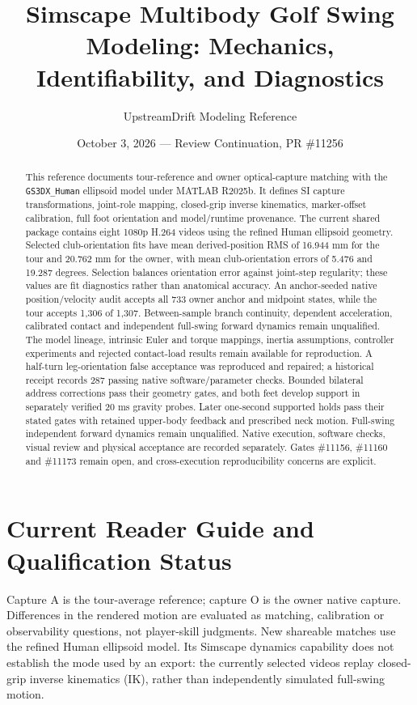\documentclass[11pt,a4paper]{article}
\title{\textbf{Simscape Multibody Golf Swing Modeling: Mechanics, Identifiability, and Diagnostics}}
\author{UpstreamDrift Modeling Reference}
\date{October 3, 2026 --- Review Continuation, PR \#11256}
\begin{document}
\maketitle

\begin{abstract}
This reference documents tour-reference and owner optical-capture matching with
the \texttt{GS3DX\_Human} ellipsoid model under MATLAB R2025b. It defines SI
capture transformations, joint-role mapping, closed-grip inverse kinematics,
marker-offset calibration, full foot orientation and model/runtime provenance.
The current shared package contains eight 1080p H.264 videos using the
refined Human ellipsoid geometry. Selected club-orientation fits have
mean derived-position RMS of 16.944 mm for the tour and 20.762 mm for
the owner, with mean club-orientation errors of 5.476 and 19.287 degrees.
Selection balances orientation error against joint-step regularity;
these values are fit diagnostics rather than anatomical accuracy.
An anchor-seeded native position/velocity audit accepts all 733 owner
anchor and midpoint states, while the tour accepts 1,306 of 1,307.
Between-sample branch continuity, dependent acceleration, calibrated
contact and independent full-swing forward dynamics remain unqualified.
The model lineage, intrinsic Euler and torque mappings, inertia
assumptions, controller experiments and rejected contact-load results remain
available for reproduction. A half-turn leg-orientation false acceptance was
reproduced and repaired; a historical receipt records 287 passing native software/parameter checks. Bounded
bilateral address corrections pass their geometry gates, and both feet
develop support in separately verified 20 ms gravity probes. Later one-second supported holds pass their stated gates with retained upper-body feedback and prescribed neck motion. Full-swing independent forward dynamics remain unqualified. Native execution, software checks, visual review
and physical acceptance are recorded separately. Gates \#11156, \#11160 and
\#11173 remain open, and cross-execution reproducibility concerns are explicit.
\end{abstract}

\tableofcontents
\newpage

\section{Current Reader Guide and Qualification Status}
Capture A is the tour-average reference; capture O is the owner native
capture. Differences in the rendered motion are evaluated as
matching, calibration or observability questions, not player-skill
judgments. New shareable matches use the refined Human ellipsoid model.
Its Simscape dynamics capability does not establish the mode used by an
export: the currently selected videos replay closed-grip inverse
kinematics (IK), rather than independently simulated full-swing motion.
\end{document}
